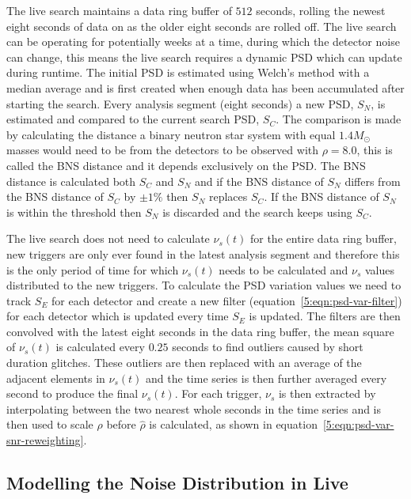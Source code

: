 
The live search maintains a data ring buffer of $512$ seconds, rolling the newest eight seconds of data on as the older eight seconds are rolled off. The live search can be operating for potentially weeks at a time, during which the detector noise can change, this means the live search requires a dynamic PSD which can update during runtime. The initial PSD is estimated using Welch's method with a median average and is first created when enough data has been accumulated after starting the search. Every analysis segment (eight seconds) a new PSD, $S_{N}$, is estimated and compared to the current search PSD, $S_{C}$. The comparison is made by calculating the distance a binary neutron star system with equal $1.4 M_{\odot}$ masses would need to be from the detectors to be observed with $\rho = 8.0$, this is called the BNS distance and it depends exclusively on the PSD. The BNS distance is calculated both $S_{C}$ and $S_{N}$ and if the BNS distance of $S_{N}$ differs from the BNS distance of $S_{C}$ by $\pm1\%$ then $S_{N}$ replaces $S_{C}$. If the BNS distance of $S_{N}$ is within the threshold then $S_{N}$ is discarded and the search keeps using $S_{C}$.

The live search does not need to calculate $\nu_{s}(t)$ for the entire data ring buffer, new triggers are only ever found in the latest analysis segment and therefore this is the only period of time for which $\nu_{s}(t)$ needs to be calculated and $\nu_{s}$ values distributed to the new triggers. To calculate the PSD variation values we need to track $S_{E}$ for each detector and create a new filter (equation~\ref{5:eqn:psd-var-filter}) for each detector which is updated every time $S_{E}$ is updated. The filters are then convolved with the latest eight seconds in the data ring buffer, the mean square of $\nu_{s}(t)$ is calculated every $0.25$ seconds to find outliers caused by short duration glitches. These outliers are then replaced with an average of the adjacent elements in $\nu_{s}(t)$ and the time series is then further averaged every second to produce the final $\nu_{s}(t)$. For each trigger, $\nu_{s}$ is then extracted by interpolating between the two nearest whole seconds in the time series and is then used to scale $\rho$ before $\hat{\rho}$ is calculated, as shown in equation~\ref{5:eqn:psd-var-snr-reweighting}.

\subsection{\label{5:subsec:template-fits}Modelling the Noise Distribution in Live}

